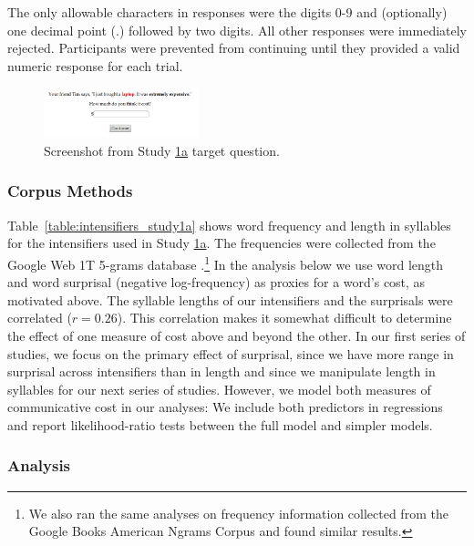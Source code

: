 The only allowable characters in responses were the digits 0-9 and (optionally) one decimal point (.) followed by two digits. All other responses were immediately rejected.
Participants were prevented from continuing until they provided a valid numeric response for each trial.

\begin{figure}[ht]
\begin{center}
\includegraphics[width=0.4\textwidth]{exp1-q.png}
\end{center}
\caption{Screenshot from Study \hyperref[sec:study1a]{1a} target question.} 
\label{fig:question_study1a}
\end{figure}

\subsubsection{Corpus Methods}

Table~\ref{table:intensifiers_study1a} shows word frequency and length in syllables for the intensifiers used in Study \hyperref[sec:study1a]{1a}.
The frequencies were collected from the Google Web 1T 5-grams database \cite{brants_web_2006}.\footnote{
  We also ran the same analyses on frequency information collected from the Google Books American Ngrams Corpus \cite{michel_quantitative_2011} and found similar results.
}
In the analysis below we use word length and word surprisal (negative log-frequency) as proxies for a word's cost, as motivated above.
The syllable lengths of our intensifiers and the surprisals were correlated ($r = 0.26$).
This correlation makes it somewhat difficult to determine the effect of one measure of cost above and beyond the other.
In our first series of studies, we focus on the primary effect of surprisal, since we have more range in surprisal across intensifiers than in length and since we manipulate length in syllables for our next series of studies.
However, we model both measures of communicative cost in our analyses: We include both predictors in regressions and report likelihood-ratio tests between the full model and simpler models.

\subsubsection{Analysis}

